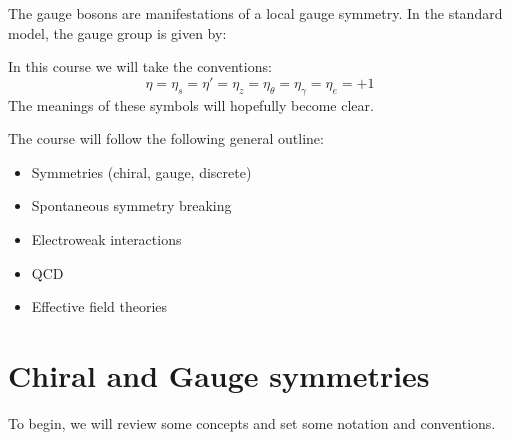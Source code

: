 \documentclass{jknotes}
\begin{document}
The gauge bosons are manifestations of a local gauge symmetry. In the standard model, the gauge group is given by:
\begin{figure}[H]
    \centering
\end{figure}

In this course we will take the conventions:
\begin{equation}
    \eta=\eta_s=\eta'=\eta_z=\eta_\theta=\eta_\gamma=\eta_e=+1
\end{equation}
The meanings of these symbols will hopefully become clear.

The course will follow the following general outline:
\begin{itemize}
    \item Symmetries (chiral, gauge, discrete)
    \item Spontaneous symmetry breaking
    \item Electroweak interactions
    \item QCD
    \item Effective field theories
\end{itemize}

\section{Chiral and Gauge symmetries}
To begin, we will review some concepts and set some notation and conventions.
\end{document}
